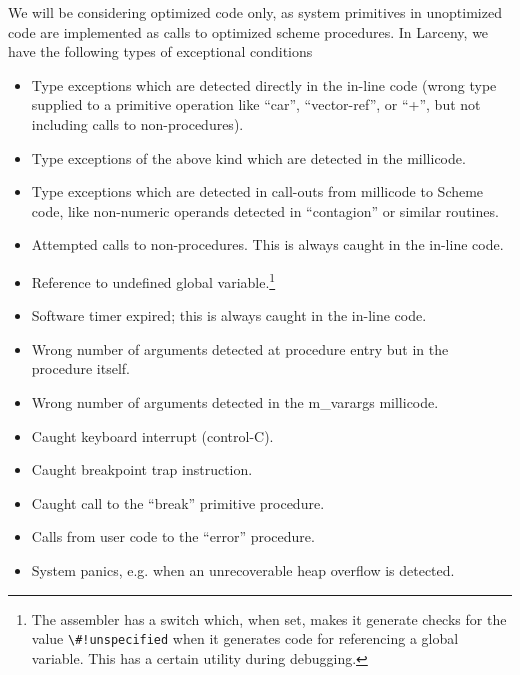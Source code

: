 We will be considering optimized code only, as system primitives in
unoptimized code are implemented as calls to optimized scheme procedures.
In Larceny, we have the following types of exceptional conditions

\begin{itemize}

\item 
Type exceptions which are detected directly in the in-line code (wrong
type supplied to a primitive operation like ``car'', ``vector-ref'', or ``+'',
but not including calls to non-procedures).

\item
Type exceptions of the above kind which are detected in the millicode.

\item
Type exceptions which are detected in call-outs from millicode to Scheme
code, like non-numeric operands detected in ``contagion'' or similar routines.

\item
Attempted calls to non-procedures. This is always caught in the in-line code.

\item
Reference to undefined global variable.\footnote{The assembler has a switch
which, when set, makes it generate checks for the value \verb+\#!unspecified+
when it generates code for referencing a global variable. This has a certain
utility during debugging.}

\item
Software timer expired; this is always caught in the in-line code.

\item
Wrong number of arguments detected at procedure entry but in the procedure
itself.

\item
Wrong number of arguments detected in the {\sc m\_varargs} millicode.

\item
Caught keyboard interrupt (control-C).

\item
Caught breakpoint trap instruction.

\item
Caught call to the ``break'' primitive procedure.

\item
Calls from user code to the ``error'' procedure.

\item
System panics, e.g. when an unrecoverable heap overflow is detected.
\end{itemize}


